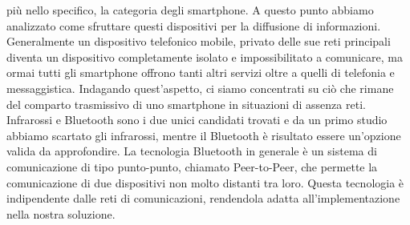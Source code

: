 più nello specifico, la categoria degli smartphone. A questo punto abbiamo analizzato come sfruttare questi dispositivi per la diffusione di informazioni. Generalmente un dispositivo telefonico mobile, privato delle sue reti principali diventa un dispositivo completamente isolato e impossibilitato a comunicare, ma ormai tutti gli smartphone offrono tanti altri servizi oltre a quelli di telefonia e messaggistica. Indagando quest'aspetto, ci siamo concentrati su ciò che rimane del comparto trasmissivo di uno smartphone in situazioni di assenza reti. Infrarossi e Bluetooth sono i due unici candidati trovati e da un primo studio abbiamo scartato gli infrarossi, mentre il Bluetooth è risultato essere un'opzione valida da approfondire. La tecnologia Bluetooth in generale è un sistema di comunicazione di tipo punto-punto, chiamato Peer-to-Peer, che permette la comunicazione di due dispositivi non molto distanti tra loro. Questa tecnologia è indipendente dalle reti di comunicazioni, rendendola adatta all'implementazione nella nostra soluzione.

